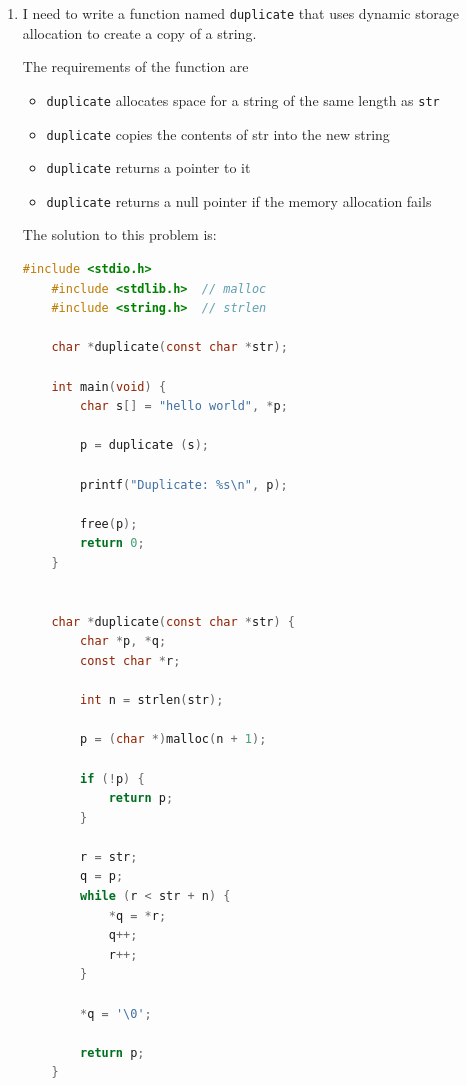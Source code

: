 \documentclass[12pt]{article}
\begin{document}
\begin{enumerate}[1.]
    \item

    I need to write a function named \texttt{duplicate} that uses dynamic storage
    allocation to create a copy of a string.

    \bigskip

    The requirements of the function are

    \begin{itemize}
        \item \texttt{duplicate} allocates space for a string of the same length as \texttt{str}
        \item \texttt{duplicate} copies the contents of str into the new string
        \item \texttt{duplicate} returns a pointer to it
        \item \texttt{duplicate} returns a null pointer if the memory allocation fails
    \end{itemize}

    \bigskip

    The solution to this problem is:

    \bigskip

\begin{lstlisting}[language=c]
    #include <stdio.h>
    #include <stdlib.h>  // malloc
    #include <string.h>  // strlen

    char *duplicate(const char *str);

    int main(void) {
        char s[] = "hello world", *p;

        p = duplicate (s);

        printf("Duplicate: %s\n", p);

        free(p);
        return 0;
    }


    char *duplicate(const char *str) {
        char *p, *q;
        const char *r;

        int n = strlen(str);

        p = (char *)malloc(n + 1);

        if (!p) {
            return p;
        }

        r = str;
        q = p;
        while (r < str + n) {
            *q = *r;
            q++;
            r++;
        }

        *q = '\0';

        return p;
    }
\end{lstlisting}

    \bigskip


\end{enumerate}
\end{document}
